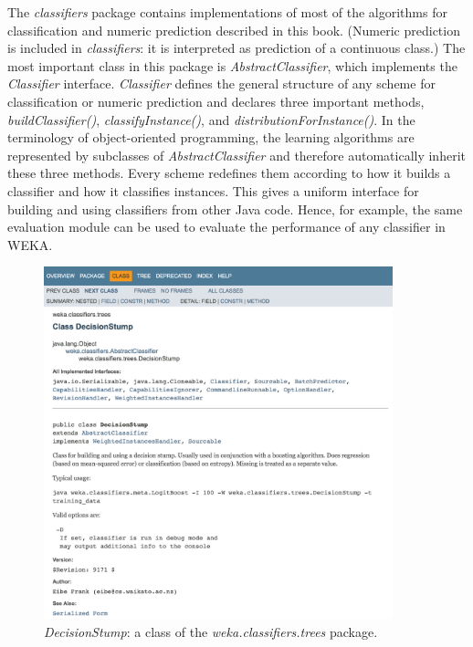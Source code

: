 The \textit{classifiers} package contains implementations of most of
the algorithms for classification and numeric prediction described in
this book. (Numeric prediction is included in \textit{classifiers}: it
is interpreted as prediction of a continuous class.) The most
important class in this package is \textit{AbstractClassifier}, which
implements the \textit{Classifier} interface. \textit{Classifier}
defines the general structure of any scheme for classification or
numeric prediction and declares three important methods,
\textit{buildClassifier()}, \textit{classifyInstance()}, and
\textit{distributionForInstance()}. In the terminology of object-oriented
programming, the learning algorithms are represented by subclasses of
\textit{AbstractClassifier} and therefore automatically inherit these three
methods. Every scheme redefines them according to how it builds a
classifier and how it classifies instances. This gives a uniform
interface for building and using classifiers from other Java
code. Hence, for example, the same evaluation module can be used to
evaluate the performance of any classifier in WEKA.

\begin{figure}[!thp]
\centering
\includegraphics[width=0.9\textwidth]{images/B5_2a.png}
\caption{\textit{DecisionStump}: a class of the \textit{weka.classifiers.trees} package.}
\end{figure}

